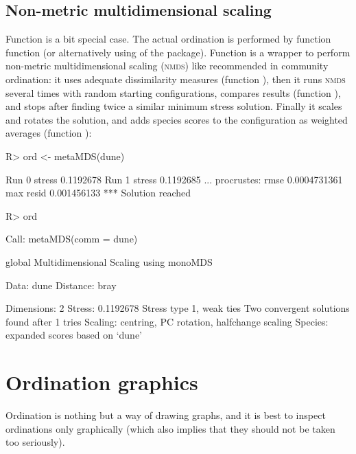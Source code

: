 \documentclass[article,nojss]{jss}
\begin{document}
\subsection{Non-metric multidimensional scaling}


Function  is a bit special case.  The actual ordination
is performed by function  function  (or
alternatively using  of the  package).
Function  is a wrapper to perform non-metric
multidimensional scaling (\textsc{nmds}) like recommended in community
ordination: it uses adequate dissimilarity measures (function
), then it runs \textsc{nmds} several times with random
starting configurations, compares results (function
), and stops after finding twice a similar minimum
stress solution.  Finally it scales and rotates the solution, and adds
species scores to the configuration as weighted averages (function
):
\begin{Schunk}
\begin{Sinput}
R> ord <- metaMDS(dune)
\end{Sinput}
\begin{Soutput}
Run 0 stress 0.1192678 
Run 1 stress 0.1192685 
... procrustes: rmse 0.0004731361  max resid 0.001456133 
*** Solution reached
\end{Soutput}
\begin{Sinput}
R> ord
\end{Sinput}
\begin{Soutput}
Call:
metaMDS(comm = dune) 

global Multidimensional Scaling using monoMDS

Data:     dune 
Distance: bray 

Dimensions: 2 
Stress:     0.1192678 
Stress type 1, weak ties
Two convergent solutions found after 1 tries
Scaling: centring, PC rotation, halfchange scaling 
Species: expanded scores based on ‘dune’ 
\end{Soutput}
\end{Schunk}

\section{Ordination graphics}

Ordination is nothing but a way of drawing graphs, and it is best to
inspect ordinations only graphically (which also implies that they
should not be taken too seriously).
\end{document}
